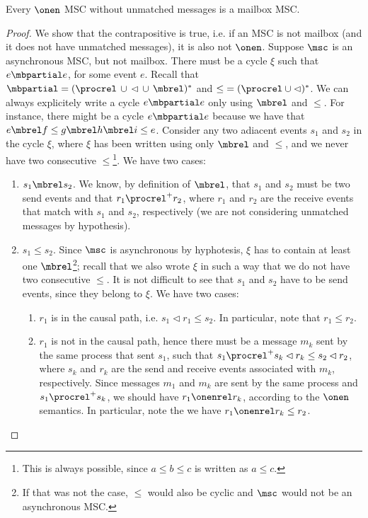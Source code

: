 \begin{proposition}%
	Every $\onen$ MSC without unmatched messages is a mailbox MSC.
\end{proposition}
\begin{proof}
We show that the contrapositive is true, i.e. if an MSC is not mailbox (and it does not have unmatched messages), it is also not $\onen$. Suppose $\msc$ is an asynchronous MSC, but not mailbox. There must be a cycle $\xi$ such that  $e \mbpartial e$, for some event $e$. Recall that ${\mbpartial} = ({\procrel} \,\cup\, {\lhd} \,\cup\, {\mbrel})^\ast$ and ${\le} = ({\procrel} \cup {\lhd})^\ast$. We can always explicitely write a cycle $e \mbpartial e$ only using $\mbrel$ and $\le$. For instance, there might be a cycle $e \mbpartial e$ because we have that $e \mbrel f \le g \mbrel h \mbrel i \le e$. Consider any two adiacent events $s_1$ and $s_2$ in the cycle $\xi$, where $\xi$ has been written using only $\mbrel$ and $\le$, and we never have two consecutive $\le$\footnote{This is always possible, since $a \le b \le c$ is written as $a \le c$.}. We have two cases:
\begin{enumerate}
	\item $s_1 \mbrel s_2$. We know, by definition of $\mbrel$, that $s_1$ and $s_2$ must be two send events and that $r_1 \procrel^+ r_2$, where $r_1$ and $r_2$ are the receive events that match with $s_1$ and $s_2$, respectively (we are not considering unmatched messages by hypothesis).
	\item $s_1 \le s_2$. Since $\msc$ is asynchronous by hyphotesis, $\xi$ has to contain at least one $\mbrel$\footnote{If that was not the case, $\le$ would also be cyclic and $\msc$ would not be an asynchronous MSC.}; recall that we also wrote $\xi$ in such a way that we do not have two consecutive $\le$. It is not difficult to see that $s_1$ and $s_2$ have to be send events, since they belong to $\xi$. We have two cases:
	\begin{enumerate}
		\item $r_1$ is in the causal path, i.e. $s_1 \lhd r_1 \le s_2$. In particular, note that $r_1 \le r_2$.
		\item $r_1$ is not in the causal path, hence there must be a message $m_k$ sent by the same process that sent $s_1$, such that $s_1 \procrel^+ s_k \lhd r_k \le s_2 \lhd r_2$, where $s_k$ and $r_k$ are the send and receive events associated with $m_k$, respectively. Since messages $m_1$ and $m_k$ are sent by the same process and $s_1 \procrel^+ s_k$, we should have $r_1 \onenrel r_k$, according to the $\onen$ semantics. In particular, note the we have $r_1 \onenrel r_k \le r_2$.

\end{enumerate}
\end{enumerate}
\end{proof}
